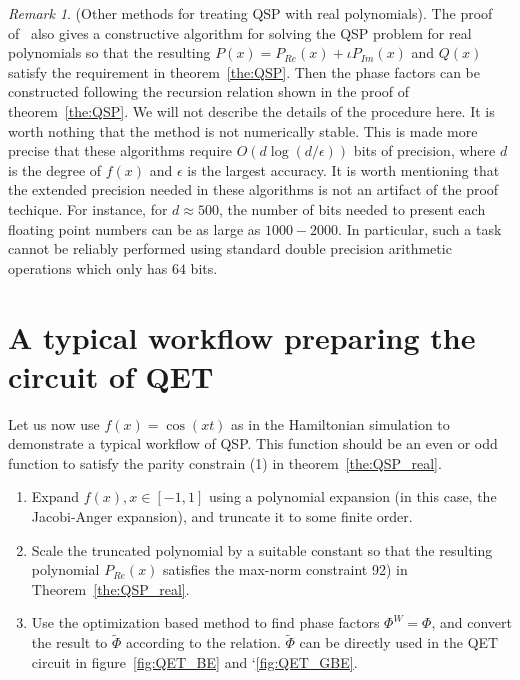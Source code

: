 \documentclass[12pt, oneside]{book}
\theoremstyle{definition}
\theoremstyle{definition}
\theoremstyle{remark}
\newtheorem*{remark}{Remark}
\begin{document}
\begin{remark}
    (Other methods for treating QSP with real polynomials). The proof of~\cite{gilyen2019quantum} also gives a constructive algorithm for solving the QSP problem for real polynomials so that the resulting $P(x)=P_{Re}(x)+\iota P_{Im}(x)$ and $Q(x)$ satisfy the requirement in theorem~\ref{the:QSP}. Then the phase factors can be constructed following the recursion relation shown in the proof of theorem~\ref{the:QSP}. We will not describe the details of the procedure here. It is worth nothing that the method is not numerically stable. This is made more precise that these algorithms require $O(d\log(d/\epsilon))$ bits of precision, where $d$ is the degree of $f(x)$ and $\epsilon$ is the largest accuracy. It is worth mentioning that the extended precision needed in these algorithms is not an artifact of the proof techique. For instance, for $d\approx 500$, the number of bits needed to present each floating point numbers can be as large as $1000-2000$. In particular, such a task cannot be reliably performed using standard double precision arithmetic operations which only has $64$ bits.
\end{remark}
\section{A typical workflow preparing the circuit of QET}
Let us now use $f(x)=\cos(xt)$ as in the Hamiltonian simulation to demonstrate a typical workflow of QSP. This function should be an even or odd function to satisfy the parity constrain (1) in theorem~\ref{the:QSP_real}.
\begin{enumerate}
    \item Expand $f(x),x\in[-1,1]$ using a polynomial expansion (in this case, the Jacobi-Anger expansion), and truncate it to some finite order.
    \item Scale the truncated polynomial by a suitable constant so that the resulting polynomial $P_{Re}(x)$ satisfies the max-norm constraint 92) in Theorem~\ref{the:QSP_real}.
    \item Use the optimization based method to find phase factors $\Phi^W=\Phi$, and convert the result to $\tilde{\Phi}$ according to the relation. $\tilde{\Phi}$ can be directly used in the QET circuit in figure~\ref{fig:QET_BE} and `\ref{fig:QET_GBE}.
\end{enumerate}
\end{document}
